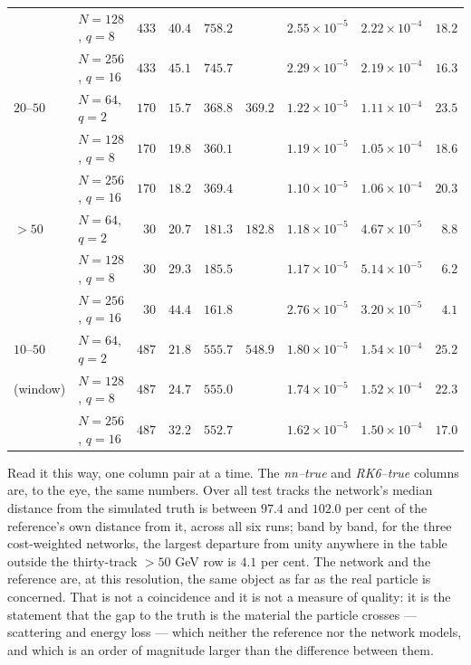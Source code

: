 \documentclass[11pt,a4paper]{article}
\begin{document}
\begin{table}[tbp]
\begin{tabular}{llrrrrrrr}
              & $N = 128$, $q = 8$ & $433$ & $40.4$ & $758.2$ &         & $2.55\times10^{-5}$ & $2.22\times10^{-4}$ & $18.2$ \\
              & $N = 256$, $q = 16$& $433$ & $45.1$ & $745.7$ &         & $2.29\times10^{-5}$ & $2.19\times10^{-4}$ & $16.3$ \\
    \addlinespace
    $20$--$50$ & $N = 64$, $q = 2$  & $170$ & $15.7$ & $368.8$ & $369.2$ & $1.22\times10^{-5}$ & $1.11\times10^{-4}$ & $23.5$ \\
               & $N = 128$, $q = 8$ & $170$ & $19.8$ & $360.1$ &         & $1.19\times10^{-5}$ & $1.05\times10^{-4}$ & $18.6$ \\
               & $N = 256$, $q = 16$& $170$ & $18.2$ & $369.4$ &         & $1.10\times10^{-5}$ & $1.06\times10^{-4}$ & $20.3$ \\
    \addlinespace
    $>50$ & $N = 64$, $q = 2$  & $30$ & $20.7$ & $181.3$ & $182.8$ & $1.18\times10^{-5}$ & $4.67\times10^{-5}$ & $8.8$ \\
          & $N = 128$, $q = 8$ & $30$ & $29.3$ & $185.5$ &         & $1.17\times10^{-5}$ & $5.14\times10^{-5}$ & $6.2$ \\
          & $N = 256$, $q = 16$& $30$ & $44.4$ & $161.8$ &         & $2.76\times10^{-5}$ & $3.20\times10^{-5}$ & $4.1$ \\
    \addlinespace
    $10$--$50$ & $N = 64$, $q = 2$  & $487$ & $21.8$ & $555.7$ & $548.9$ & $1.80\times10^{-5}$ & $1.54\times10^{-4}$ & $25.2$ \\
    (window)   & $N = 128$, $q = 8$ & $487$ & $24.7$ & $555.0$ &         & $1.74\times10^{-5}$ & $1.52\times10^{-4}$ & $22.3$ \\
               & $N = 256$, $q = 16$& $487$ & $32.2$ & $552.7$ &         & $1.62\times10^{-5}$ & $1.50\times10^{-4}$ & $17.0$ \\
    \bottomrule
  \end{tabular}
\end{table}

Read it this way, one column pair at a time. The \emph{nn--true} and
\emph{RK6--true} columns are, to the eye, the same numbers. Over all test tracks
the network's median distance from the simulated truth is between $97.4$ and
$102.0$ per cent of the reference's own distance from it, across all six runs;
band by band, for the three cost-weighted networks, the largest departure from
unity anywhere in the table outside the thirty-track $>50$ GeV row is $4.1$ per
cent. The network and the reference are, at this resolution, the same object as
far as the real particle is concerned. That is not a coincidence and it is not a
measure of quality: it is the statement that the gap to the truth is the
material the particle crosses --- scattering and energy loss --- which neither
the reference nor the network models, and which is an order of magnitude larger
than the difference between them.
\end{document}
